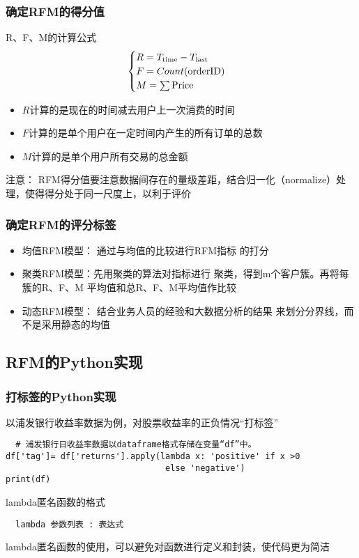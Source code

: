 \documentclass[t]{beamer}
\begin{document}
\begin{frame} \frametitle{确定RFM的得分值}
  R、F、M的计算公式
\[\begin{cases}
R=T_{\rm time}-T_{\rm last} \\
F=Count({\rm order ID})\\
M=\sum {\rm Price} 
\end{cases}\]
\begin{itemize}
  \item $R$计算的是现在的时间减去用户上一次消费的时间
  \item $F$计算的是单个用户在一定时间内产生的所有订单的总数
  \item $M$计算的是单个用户所有交易的总金额
\end{itemize}
\begin{block}{注意：}
RFM得分值要注意数据间存在的量级差距，结合归一化（normalize）处理，使得得分处于同一尺度上，以利于评价
\end{block}
\end{frame}


\begin{frame}
    \frametitle{确定RFM的评分标签}
\begin{itemize}
  \item  均值RFM模型：  通过与均值的比较进行RFM指标 的打分
  \item  聚类RFM模型：先用聚类的算法对指标进行 聚类，得到m个客户簇。再将每簇的R、F、M 平均值和总R、F、M平均值作比较
  \item  动态RFM模型：
  结合业务人员的经验和大数据分析的结果
  来划分分界线，而不是采用静态的均值
\end{itemize}
    

\end{frame}

\subsection{RFM的Python实现}
\begin{frame}[fragile]
    \frametitle{打标签的Python实现}
    以浦发银行收益率数据为例，对股票收益率的正负情况“打标签”
\begin{lstlisting}
  # 浦发银行日收益率数据以dataframe格式存储在变量“df”中。 
df['tag']= df['returns'].apply(lambda x: 'positive' if x >0 
                                else 'negative') 
print(df)
\end{lstlisting}  

\begin{block}{lambda匿名函数的格式}
\begin{lstlisting}
  lambda 参数列表 : 表达式
\end{lstlisting}
lambda匿名函数的使用，可以避免对函数进行定义和封装，使代码更为简洁
\end{block}
\end{frame}
\end{document}

